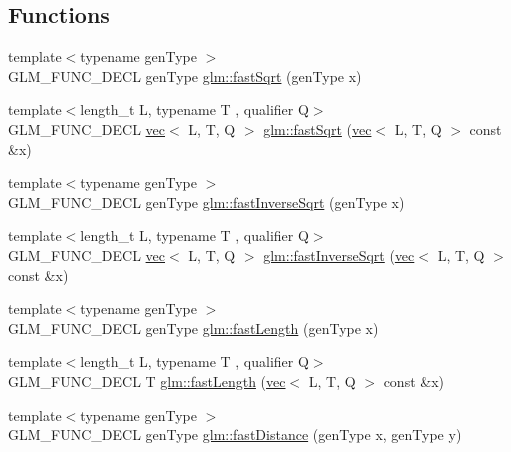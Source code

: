 \subsection*{Functions}
\begin{DoxyCompactItemize}
\item 
{\footnotesize template$<$typename gen\+Type $>$ }\\G\+L\+M\+\_\+\+F\+U\+N\+C\+\_\+\+D\+E\+CL gen\+Type \hyperlink{group__gtx__fast__square__root_ga6c460e9414a50b2fc455c8f64c86cdc9}{glm\+::fast\+Sqrt} (gen\+Type x)
\item 
{\footnotesize template$<$length\+\_\+t L, typename T , qualifier Q$>$ }\\G\+L\+M\+\_\+\+F\+U\+N\+C\+\_\+\+D\+E\+CL \hyperlink{structglm_1_1vec}{vec}$<$ L, T, Q $>$ \hyperlink{group__gtx__fast__square__root_gae83f0c03614f73eae5478c5b6274ee6d}{glm\+::fast\+Sqrt} (\hyperlink{structglm_1_1vec}{vec}$<$ L, T, Q $>$ const \&x)
\item 
{\footnotesize template$<$typename gen\+Type $>$ }\\G\+L\+M\+\_\+\+F\+U\+N\+C\+\_\+\+D\+E\+CL gen\+Type \hyperlink{group__gtx__fast__square__root_ga7f081b14d9c7035c8714eba5f7f75a8f}{glm\+::fast\+Inverse\+Sqrt} (gen\+Type x)
\item 
{\footnotesize template$<$length\+\_\+t L, typename T , qualifier Q$>$ }\\G\+L\+M\+\_\+\+F\+U\+N\+C\+\_\+\+D\+E\+CL \hyperlink{structglm_1_1vec}{vec}$<$ L, T, Q $>$ \hyperlink{group__gtx__fast__square__root_gadcd7be12b1e5ee182141359d4c45dd24}{glm\+::fast\+Inverse\+Sqrt} (\hyperlink{structglm_1_1vec}{vec}$<$ L, T, Q $>$ const \&x)
\item 
{\footnotesize template$<$typename gen\+Type $>$ }\\G\+L\+M\+\_\+\+F\+U\+N\+C\+\_\+\+D\+E\+CL gen\+Type \hyperlink{group__gtx__fast__square__root_gafe697d6287719538346bbdf8b1367c59}{glm\+::fast\+Length} (gen\+Type x)
\item 
{\footnotesize template$<$length\+\_\+t L, typename T , qualifier Q$>$ }\\G\+L\+M\+\_\+\+F\+U\+N\+C\+\_\+\+D\+E\+CL T \hyperlink{group__gtx__fast__square__root_ga90f66be92ef61e705c005e7b3209edb8}{glm\+::fast\+Length} (\hyperlink{structglm_1_1vec}{vec}$<$ L, T, Q $>$ const \&x)
\item 
{\footnotesize template$<$typename gen\+Type $>$ }\\G\+L\+M\+\_\+\+F\+U\+N\+C\+\_\+\+D\+E\+CL gen\+Type \hyperlink{group__gtx__fast__square__root_gaac333418d0c4e0cc6d3d219ed606c238}{glm\+::fast\+Distance} (gen\+Type x, gen\+Type y)

\end{DoxyCompactItemize}
